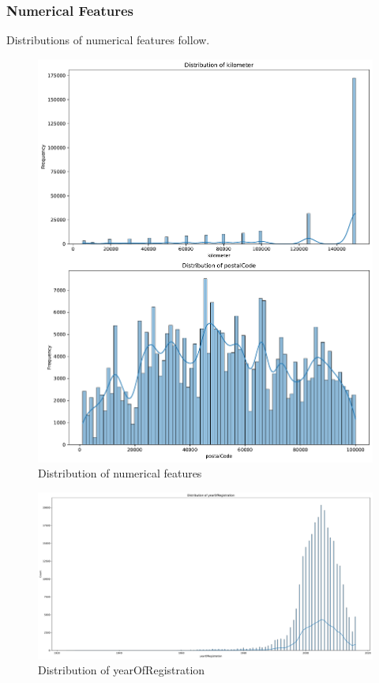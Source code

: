 \documentclass[conference]{IEEEtran}
\begin{document}
\subsubsection{Numerical Features}
Distributions of numerical features follow.
\begin{figure}[H]
\centering
\includegraphics[width=\linewidth]{figures/kilometer_postalCode_distribution.pdf}
\caption{Distribution of numerical features}
\label{fig:kilometer_postalCode_dist}
\end{figure}

\begin{figure}[H]
\centering
\includegraphics[width=\linewidth]{figures/yearOfRegistration_distribution.pdf}
\caption{Distribution of yearOfRegistration}
\label{fig:yearOfRegistration_dist}
\end{figure}
\end{document}
